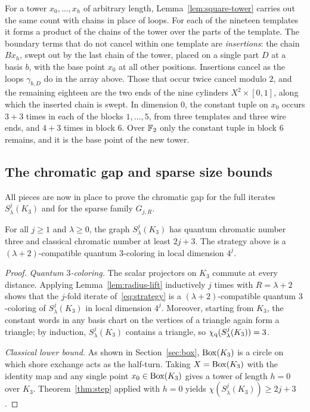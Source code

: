 For a tower $x_0,\ldots,x_h$ of arbitrary length, Lemma~\ref{lem:square-tower} carries out the same count with chains in place of loops. For each of the nineteen templates it forms a product of the chains of the tower over the parts of the template. The boundary terms that do not cancel within one template are \emph{insertions}: the chain $Bx_h$, swept out by the last chain of the tower, placed on a single part $D$ at a basis $b$, with the base point $x_0$ at all other positions. Insertions cancel as the loops $\gamma_{b,D}$ do in the array above. Those that occur twice cancel modulo $2$, and the remaining eighteen are the two ends of the nine cylinders $X^2\times[0,1]$, along which the inserted chain is swept. In dimension $0$, the constant tuple on $x_0$ occurs $3+3$ times in each of the blocks $1,\ldots,5$, from three templates and three wire ends, and $4+3$ times in block $6$. Over $\mathbb F_2$ only the constant tuple in block $6$ remains, and it is the base point of the new tower.

\subsection{The chromatic gap and sparse size bounds}\label{sec:gap-results}

All pieces are now in place to prove the chromatic gap for the full iterates $S^j_\lambda(K_3)$ and for the sparse family $G_{j,R}$.

\begin{theorem}\label{thm:gap}
For all $j\ge1$ and $\lambda\ge0$, the graph $S^j_\lambda(K_3)$ has quantum chromatic number three and classical chromatic number at least $2j+3$. The strategy above is a $(\lambda+2)$-compatible quantum $3$-coloring in local dimension $4^j$.
\end{theorem}
\begin{proof}
\emph{Quantum $3$-coloring.} The scalar projectors on $K_3$ commute at every distance. Applying Lemma~\ref{lem:radius-lift} inductively $j$ times with $R=\lambda+2$ shows that the $j$-fold iterate of~\eqref{eq:strategy} is a $(\lambda+2)$-compatible quantum $3$-coloring of $S^j_\lambda(K_3)$ in local dimension $4^j$. Moreover, starting from $K_3$, the constant words in any basis chart on the vertices of a triangle again form a triangle; by induction, $S^j_\lambda(K_3)$ contains a triangle, so $\chi_{\mathrm q}(S^j_\lambda(K_3))=3$.

\emph{Classical lower bound.} As shown in Section~\ref{sec:box}, $\operatorname{Box}(K_3)$ is a circle on which shore exchange acts as the half-turn. Taking $X=\operatorname{Box}(K_3)$ with the identity map and any single point $x_0\in\operatorname{Box}(K_3)$ gives a tower of length $h=0$ over $K_3$. Theorem~\ref{thm:step} applied with $h=0$ yields $\chi(S^j_\lambda(K_3))\ge2j+3$.
\end{proof}

